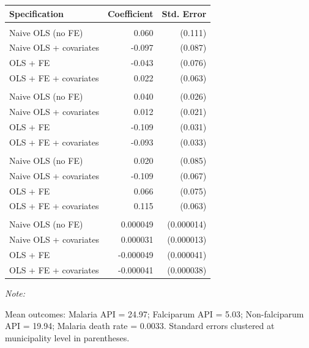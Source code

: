 {\small
\begin{tabular}[t]{lrr}
\toprule
Specification & Coefficient & Std. Error\\
\midrule
\addlinespace[0.3em]
\multicolumn{3}{l}{\textbf{Malaria API}}\\
\hspace{1em}Naive OLS (no FE) & 0.060 & (0.111)\\
\hspace{1em}Naive OLS + covariates & -0.097 & (0.087)\\
\hspace{1em}OLS + FE & -0.043 & (0.076)\\
\hspace{1em}OLS + FE + covariates & 0.022 & (0.063)\\
\addlinespace[0.3em]
\multicolumn{3}{l}{\textbf{Falciparum API}}\\
\hspace{1em}Naive OLS (no FE) & 0.040 & (0.026)\\
\hspace{1em}Naive OLS + covariates & 0.012 & (0.021)\\
\hspace{1em}OLS + FE & -0.109 & (0.031)\\
\hspace{1em}OLS + FE + covariates & -0.093 & (0.033)\\
\addlinespace[0.3em]
\multicolumn{3}{l}{\textbf{Non-falciparum API}}\\
\hspace{1em}Naive OLS (no FE) & 0.020 & (0.085)\\
\hspace{1em}Naive OLS + covariates & -0.109 & (0.067)\\
\hspace{1em}OLS + FE & 0.066 & (0.075)\\
\hspace{1em}OLS + FE + covariates & 0.115 & (0.063)\\
\addlinespace[0.3em]
\multicolumn{3}{l}{\textbf{Malaria death rate}}\\
\hspace{1em}Naive OLS (no FE) & 0.000049 & (0.000014)\\
\hspace{1em}Naive OLS + covariates & 0.000031 & (0.000013)\\
\hspace{1em}OLS + FE & -0.000049 & (0.000041)\\
\hspace{1em}OLS + FE + covariates & -0.000041 & (0.000038)\\
\bottomrule
\end{tabular}
\begin{tablenotes}
\item \textit{Note: } 
\item Mean outcomes: Malaria API = 24.97; Falciparum API = 5.03; Non-falciparum API = 19.94; Malaria death rate = 0.0033. Standard errors clustered at municipality level in parentheses.
\end{tablenotes}
}
